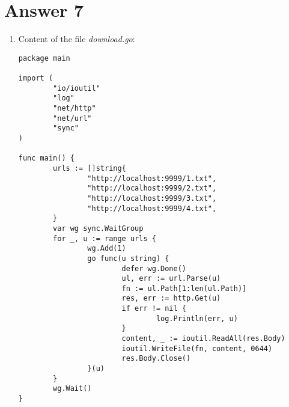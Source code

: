 \documentclass[11pt,a4paper]{article}
\begin{document}
\section*{Answer 7}
\begin{enumerate}
\item Content of the file {\it download.go}:
\begin{verbatim}
package main

import (
        "io/ioutil"
        "log"
        "net/http"
        "net/url"
        "sync"
)

func main() {
        urls := []string{
                "http://localhost:9999/1.txt",
                "http://localhost:9999/2.txt",
                "http://localhost:9999/3.txt",
                "http://localhost:9999/4.txt",
        }
        var wg sync.WaitGroup
        for _, u := range urls {
                wg.Add(1)
                go func(u string) {
                        defer wg.Done()
                        ul, err := url.Parse(u)
                        fn := ul.Path[1:len(ul.Path)]
                        res, err := http.Get(u)
                        if err != nil {
                                log.Println(err, u)
                        }
                        content, _ := ioutil.ReadAll(res.Body)
                        ioutil.WriteFile(fn, content, 0644)
                        res.Body.Close()
                }(u)
        }
        wg.Wait()
}
\end{verbatim}
\end{enumerate}
\end{document}
